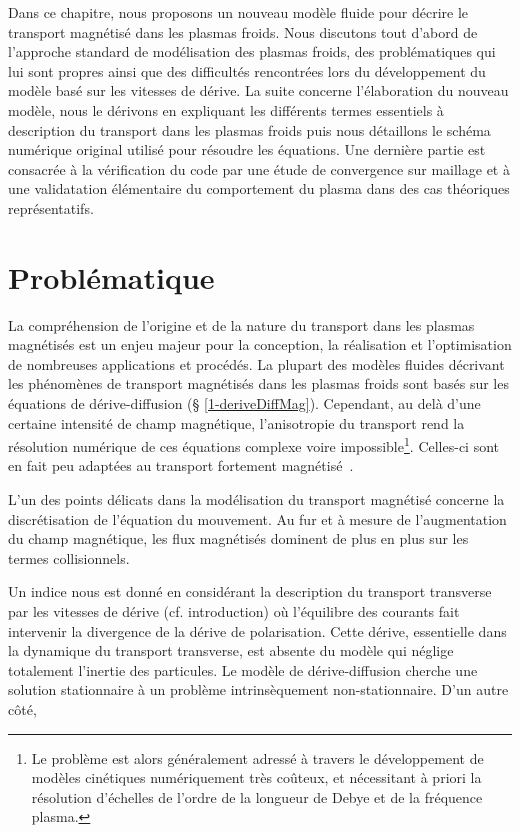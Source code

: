 \begin{refsection}


Dans ce chapitre, nous proposons un nouveau modèle fluide pour décrire le
transport magnétisé dans les plasmas froids. Nous discutons tout d'abord de
l'approche standard de modélisation des plasmas froids, des problématiques qui
lui sont propres ainsi que des difficultés rencontrées lors du développement du
modèle basé sur les vitesses de dérive. La suite concerne l'élaboration du
nouveau modèle, nous le dérivons en expliquant les différents termes essentiels
à description du transport dans les plasmas froids puis nous détaillons le
schéma numérique original utilisé pour résoudre les équations.
Une dernière partie est consacrée à la vérification du code par une étude de
convergence sur maillage et à une validatation élémentaire du comportement du
plasma dans des cas théoriques représentatifs.



\section{Problématique}

La compréhension de l'origine et de la nature du transport dans les plasmas
magnétisés est un enjeu majeur pour la conception, la réalisation et
l'optimisation de nombreuses applications et procédés. La plupart des modèles
fluides décrivant les phénomènes de transport magnétisés dans les plasmas
froids sont basés sur les équations de dérive-diffusion (\S
\ref{1-deriveDiffMag}). Cependant, au delà d'une certaine intensité de champ
magnétique, l'anisotropie du transport rend la résolution numérique de ces
équations complexe voire impossible\footnote{Le problème est alors généralement
adressé à travers le développement de modèles cinétiques numériquement très
coûteux, et nécessitant à priori la résolution d'échelles de l'ordre de la
longueur de Debye et de la fréquence plasma.}.
Celles-ci sont en fait peu adaptées au transport fortement
magnétisé~\parencite{Golant}.

L'un des points délicats dans la modélisation du transport magnétisé concerne la
discrétisation de l'équation du mouvement. Au fur et à mesure de l'augmentation
du champ magnétique, les flux magnétisés dominent de plus en plus sur les termes
collisionnels.

Un indice nous est donné en considérant la description du transport transverse
par les vitesses de dérive (cf.
introduction) où l'équilibre des courants fait intervenir la divergence de la
dérive de polarisation. Cette dérive, essentielle dans la dynamique du transport
transverse, est absente du modèle qui néglige totalement l'inertie des
particules. Le modèle de dérive-diffusion cherche une solution stationnaire à un
problème intrinsèquement non-stationnaire.
\parencite{Fruchtman}
\parencite{Sternberg}
D'un autre côté,


\end{refsection}
